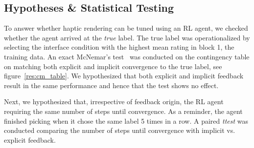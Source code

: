 \subsection{Hypotheses \& Statistical Testing}
To answer whether haptic rendering can be tuned using an RL agent, we checked whether the agent arrived at the \textit{true} label. The true label was operationalized by selecting the interface condition with the highest mean rating in block 1, the training data. An exact McNemar's test~\cite{McNEMAR1947-bp} was conducted on the contingency table on matching both explicit and implicit convergence to the true label, see figure~\ref{res:cm_table}. We hypothesized that both explicit and implicit feedback result in the same performance and hence that the test shows no effect.

Next, we hypothesized that, irrespective of feedback origin, the RL agent requiring the same number of steps until convergence. As a reminder, the agent finished picking when it chose the same label 5 times in a row. A paired \textit{ttest} was conducted comparing the number of steps until convergence with implicit vs. explicit feedback.

